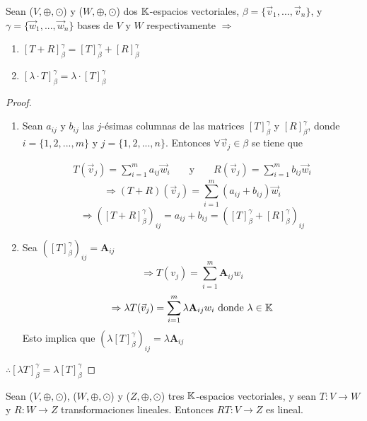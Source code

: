 \begin{theorem}
     Sean ($V, \oplus, \odot$) y ($W, \oplus, \odot$) dos $\mathbb{K}$-espacios vectoriales, $\beta = \{ \vec{v}_{1}, ..., \vec{v}_{n} \}$, y $\gamma = \{ \vec{w}_{1}, ..., \vec{w}_{n} \}$ bases de $V$ y $W$ respectivamente $\Rightarrow$

     \begin{enumerate}
         \item ${\left[ T + R\right]}_{\beta}^{\gamma} = {\left[ T \right]}_{\beta}^{\gamma} + {\left[ R \right]}_{\beta}^{\gamma}  $
         \item ${\left[ \lambda \cdot T \right]}_{\beta}^{\gamma} = \lambda \cdot {\left[ T \right]}_{\beta}^{\gamma} $
     \end{enumerate}
\end{theorem}

\begin{proof}
\begin{enumerate}
    \item  Sean $a_{ij}$ y $b_{ij}$ las $j$-ésimas columnas de las matrices $[T]_{\beta}^{\gamma}$ y $[R]_{\beta}^{\gamma}$, donde $i=\{1,2,...,m\}$ y $j=\{1,2,...,n\}$. Entonces $\forall \vec{v}_j \in \beta$ se tiene que  
    
    \begin{align*}
        T(\vec{v}_j)=\sum_{i=1}^m a_{ij}\vec{w}_i && \text{ y } && R(\vec{v}_j)=\sum_{i=1}^m b_{ij}\vec{w}_i
    \end{align*}
    \[\Rightarrow (T+R)(\vec{v}_j)=\sum_{i=1}^m(a_{ij}+b_{ij})\vec{w}_i\] \[\Rightarrow ([T+R]_{\beta}^{\gamma})_{ij}=a_{ij}+b_{ij}=([T]_{\beta}^{\gamma}+[R]_{\beta}^{\gamma})_{ij}\]
    \item Sea $([T]_{\beta}^{\gamma})_{ij}=\textbf{A}_{ij}$ \[\Rightarrow T(v_j)=\sum_{i=1}^m\textbf{A}_{ij} w_i\] \[\Rightarrow \lambda T(\vec{v}_j)=\sum_{i=1}^m \lambda \textbf{A}_{ij} w_i \ \text{donde} \ \lambda \in \K\] Esto implica que $(\lambda [T]_{\beta}^{\gamma})_{ij}=\lambda \textbf{A}_{ij} $
\end{enumerate}
    $\therefore [\lambda T]_{\beta}^{\gamma}=\lambda[T]_{\beta}^{\gamma}$
\end{proof}

\begin{theorem}
    Sean ($V, \oplus, \odot$), ($W, \oplus, \odot$) y ($Z, \oplus, \odot$) tres $\mathbb{K}$-espacios vectoriales, y sean $T:V\to W$ y $R:W \to Z$ transformaciones lineales. Entonces $RT:V\to Z$ es lineal. 
\end{theorem}

